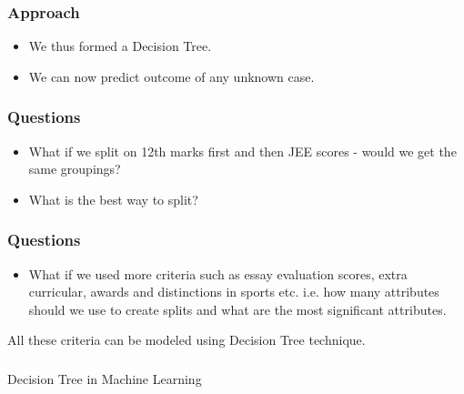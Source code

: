 \begin{frame}[fragile]\frametitle{Approach}
\begin{itemize}
	\item We thus formed a Decision Tree.
	\item We can now predict outcome of any unknown case.
	\end{itemize}

\end{frame}

\begin{frame}[fragile]\frametitle{Questions}
\begin{itemize}
	\item What if we split on 12th marks first and then JEE scores - would we get the same groupings? 
	\item What is the best way to split?
	\end{itemize}
\end{frame}

\begin{frame}[fragile]\frametitle{Questions}
\begin{itemize}
	\item What if we used more criteria such as essay evaluation scores, extra curricular, awards and distinctions in sports etc. i.e. how many attributes should we use to create splits and what are the most significant attributes.
	\end{itemize}
All these criteria can be modeled using Decision Tree technique.
\end{frame}

\begin{frame}[fragile]\frametitle{}
\begin{center}
{\Large Decision Tree in Machine Learning}
\end{center}
\end{frame}




